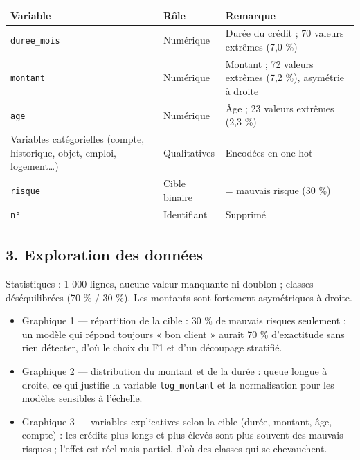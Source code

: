 \documentclass[
]{article}
\newcounter{none} %
\providecommand{\tightlist}{%
  \setlength{\itemsep}{0pt}\setlength{\parskip}{0pt}}
\begin{document}
{\def\LTcaptype{none} %
\begin{longtable}[]{@{}
  >{\raggedright\arraybackslash}p{}
  >{\raggedright\arraybackslash}p{}
  >{\raggedright\arraybackslash}p{}@{}}
\toprule\noalign{}
\begin{minipage}[b]{\linewidth}\raggedright
Variable
\end{minipage} & \begin{minipage}[b]{\linewidth}\raggedright
Rôle
\end{minipage} & \begin{minipage}[b]{\linewidth}\raggedright
Remarque
\end{minipage} \\
\midrule\noalign{}
\endhead
\bottomrule\noalign{}
\endlastfoot
\texttt{duree\_mois} & Numérique & Durée du crédit ; 70 valeurs extrêmes
(7,0 \%) \\
\texttt{montant} & Numérique & Montant ; 72 valeurs extrêmes (7,2 \%),
asymétrie à droite \\
\texttt{age} & Numérique & Âge ; 23 valeurs extrêmes (2,3 \%) \\
Variables catégorielles (compte, historique, objet, emploi,
logement\ldots) & Qualitatives & Encodées en one-hot \\
\texttt{risque} & Cible binaire & 1 = mauvais risque (30 \%) \\
\texttt{n°} & Identifiant & Supprimé \\
\end{longtable}
}

\subsection{3. Exploration des
données}\label{exploration-des-donnuxe9es}

Statistiques : 1 000 lignes, aucune valeur manquante ni doublon ;
classes déséquilibrées (70 \% / 30 \%). Les montants sont fortement
asymétriques à droite.

\begin{itemize}
\tightlist
\item
  Graphique 1 --- répartition de la cible : 30 \% de mauvais risques
  seulement ; un modèle qui répond toujours « bon client » aurait 70 \%
  d'exactitude sans rien détecter, d'où le choix du F1 et d'un découpage
  stratifié.
\item
  Graphique 2 --- distribution du montant et de la durée : queue longue
  à droite, ce qui justifie la variable \texttt{log\_montant} et la
  normalisation pour les modèles sensibles à l'échelle.
\item
  Graphique 3 --- variables explicatives selon la cible (durée, montant,
  âge, compte) : les crédits plus longs et plus élevés sont plus souvent
  des mauvais risques ; l'effet est réel mais partiel, d'où des classes
  qui se chevauchent.
\end{itemize}
\end{document}
